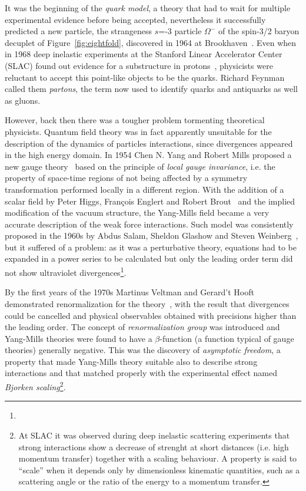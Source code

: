 It was the beginning of the {\it quark model}, a theory that had to 
wait for multiple experimental evidence before being accepted,
nevertheless it successfully predicted a new particle, the strangeness $s$=-3 
particle $\Omega^{-}$ of the spin-3/2 baryon decuplet of Figure~\ref{fig:eightfold},
discovered in 1964 at Brookhaven~\cite{PhysRevLett.12.204}. 
Even when in 1968 deep inelastic experiments at the Stanford 
Linear Accelerator Center (SLAC) found out evidence for a 
substructure in protons~\cite{}, physicists were reluctant to accept 
this point-like objects to be the quarks. Richard Feynman called 
them \textit{partons}, the term now used to identify quarks 
and antiquarks as well as gluons.

However, back then there was a tougher problem tormenting theoretical physicists. 
Quantum field theory was in fact apparently unsuitable for the description 
of the dynamics of particles interactions, since divergences appeared in the 
high energy domain. In 1954 Chen N. Yang and Robert Mills proposed a new gauge 
theory~\cite{} based on the principle of {\it local gauge invariance},
i.e. the property of space-time regions of not being affected 
by a symmetry transformation performed 
locally in a different region. With the addition of a scalar field by Peter Higgs, 
Fran\c{c}ois Englert and Robert Brout~\cite{} and the implied 
modification of the vacuum structure, the Yang-Mills field 
became a very accurate description of the weak force interactions. Such model was 
consistently proposed in the 1960s by Abdus Salam, Sheldon Glashow and Steven 
Weinberg~\cite{}, but it suffered of a problem: 
as it was a perturbative theory, equations 
had to be expanded in a power series to be calculated but only the leading order 
term did not show ultraviolet divergences\footnote{}.

By the first years of the 1970s Martinus Veltman and Gerard't Hooft demonstrated 
renormalization for the theory~\cite{}, with the result that divergences could be 
cancelled and physical observables obtained with precisions higher than the 
leading order. 
The concept of \textit{renormalization group} was introduced and 
Yang-Mills theories were found to have a $\beta$-function (a function 
typical of gauge theories) generally negative. This was the discovery 
of \textit{asymptotic freedom}, a property that made Yang-Mills theory 
suitable also to describe strong interactions and that matched properly 
with the experimental effect named \textit{Bjorken scaling}\footnote{At 
SLAC it was observed during deep inelastic scattering experiments that 
strong interactions show a decrease of strenght at short distances (i.e. 
high momentum transfer) together with a scaling behaviour. A property is 
said to ``scale'' when it depends only by dimensionless kinematic quantities, 
such as a scattering angle or the ratio of the energy to a momentum transfer.}. 

